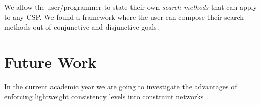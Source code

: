 \documentclass[a4paper]{article}
\begin{document}
We allow the user\slash programmer to state their own
\emph{search methods} that can apply to any CSP. We found a
framework where the user can compose their search methods
out of conjunctive and disjunctive goals.


\section{Future Work}

In the current academic year we are going to investigate the
advantages of enforcing lightweight consistency levels into
constraint networks~\cite{Bessiere2006}.



\end{document}
